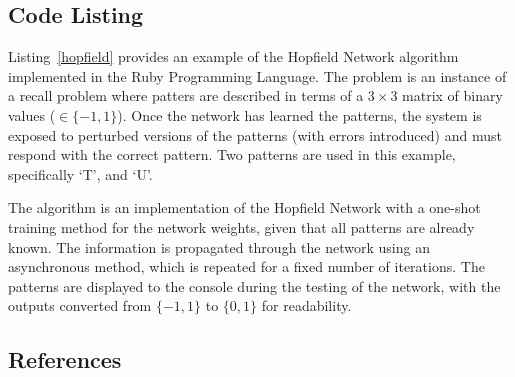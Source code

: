 \subsection{Code Listing}
Listing~\ref{hopfield} provides an example of the Hopfield Network algorithm implemented in the Ruby Programming Language. 
The problem is an instance of a recall problem where patters are described in terms of a $3 \times 3$ matrix of binary values ($\in \{-1,1\}$). Once the network has learned the patterns, the system is exposed to perturbed versions of the patterns (with errors introduced) and must respond with the correct pattern. Two patterns are used in this example, specifically `T', and `U'.

The algorithm is an implementation of the Hopfield Network with a one-shot training method for the network weights, given that all patterns are already known. The information is propagated through the network using an asynchronous method, which is repeated for a fixed number of iterations. The patterns are displayed to the console during the testing of the network, with the outputs converted from $\{-1,1\}$ to $\{0,1\}$ for readability.



\subsection{References}

